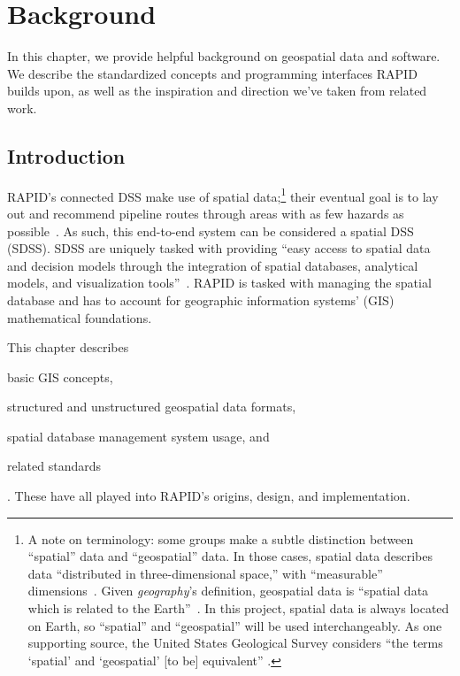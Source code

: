 \chapter{Background}
\label{background}

In this chapter, we provide helpful background on geospatial data and software. We describe the standardized concepts and programming interfaces RAPID builds upon, as well as the inspiration and direction we've taken from related work.

\section{Introduction}
\label{background_intro}
RAPID's connected DSS make use of spatial data;\footnote{A note on terminology: some groups make a subtle distinction between ``spatial'' data and ``geospatial'' data. In those cases, spatial data describes data ``distributed in three-dimensional space,'' with ``measurable'' dimensions~\cite{Bhatta2011}. Given \textit{geography}'s definition, geospatial data is ``spatial data which is related to the Earth''~\cite{Bhatta2011}. In this project, spatial data is always located on Earth, so ``spatial'' and ``geospatial'' will be used interchangeably. As one supporting source, the United States Geological Survey considers ``the terms `spatial' and `geospatial' [to be] equivalent''
\cite{Bhatta2011}.} their eventual goal is to lay out and recommend pipeline routes through areas with as few hazards as possible~\cite{Dunning2013}. As such, this end-to-end system can be considered a spatial DSS (SDSS). SDSS are uniquely tasked with providing ``easy access to spatial data and decision models through the integration of spatial databases, analytical models, and visualization tools''~\cite{RedlandsSDSS}. RAPID is tasked with managing the spatial database and has to account for geographic information systems' (GIS) mathematical foundations.

This chapter describes \begin{enumerate*}[label=\itshape\alph*\upshape)]
\item basic GIS concepts,
\item structured and unstructured geospatial data formats,
\item spatial database management system usage, and
\item related standards
\end{enumerate*}. These have all played into RAPID's origins, design, and implementation.

